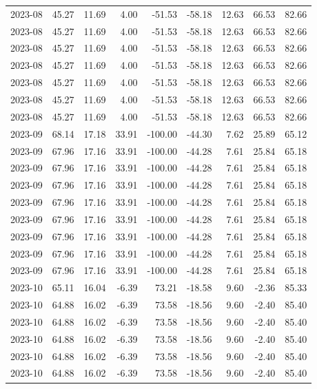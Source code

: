 \begin{table}[ht]
\begin{tabular}{lrrrrrrrr}
  2023-08 & 45.27 & 11.69 & 4.00 & -51.53 & -58.18 & 12.63 & 66.53 & 82.66 \\ 
  2023-08 & 45.27 & 11.69 & 4.00 & -51.53 & -58.18 & 12.63 & 66.53 & 82.66 \\ 
  2023-08 & 45.27 & 11.69 & 4.00 & -51.53 & -58.18 & 12.63 & 66.53 & 82.66 \\ 
  2023-08 & 45.27 & 11.69 & 4.00 & -51.53 & -58.18 & 12.63 & 66.53 & 82.66 \\ 
  2023-08 & 45.27 & 11.69 & 4.00 & -51.53 & -58.18 & 12.63 & 66.53 & 82.66 \\ 
  2023-08 & 45.27 & 11.69 & 4.00 & -51.53 & -58.18 & 12.63 & 66.53 & 82.66 \\ 
  2023-08 & 45.27 & 11.69 & 4.00 & -51.53 & -58.18 & 12.63 & 66.53 & 82.66 \\ 
  2023-09 & 68.14 & 17.18 & 33.91 & -100.00 & -44.30 & 7.62 & 25.89 & 65.12 \\ 
  2023-09 & 67.96 & 17.16 & 33.91 & -100.00 & -44.28 & 7.61 & 25.84 & 65.18 \\ 
  2023-09 & 67.96 & 17.16 & 33.91 & -100.00 & -44.28 & 7.61 & 25.84 & 65.18 \\ 
  2023-09 & 67.96 & 17.16 & 33.91 & -100.00 & -44.28 & 7.61 & 25.84 & 65.18 \\ 
  2023-09 & 67.96 & 17.16 & 33.91 & -100.00 & -44.28 & 7.61 & 25.84 & 65.18 \\ 
  2023-09 & 67.96 & 17.16 & 33.91 & -100.00 & -44.28 & 7.61 & 25.84 & 65.18 \\ 
  2023-09 & 67.96 & 17.16 & 33.91 & -100.00 & -44.28 & 7.61 & 25.84 & 65.18 \\ 
  2023-09 & 67.96 & 17.16 & 33.91 & -100.00 & -44.28 & 7.61 & 25.84 & 65.18 \\ 
  2023-09 & 67.96 & 17.16 & 33.91 & -100.00 & -44.28 & 7.61 & 25.84 & 65.18 \\ 
  2023-10 & 65.11 & 16.04 & -6.39 & 73.21 & -18.58 & 9.60 & -2.36 & 85.33 \\ 
  2023-10 & 64.88 & 16.02 & -6.39 & 73.58 & -18.56 & 9.60 & -2.40 & 85.40 \\ 
  2023-10 & 64.88 & 16.02 & -6.39 & 73.58 & -18.56 & 9.60 & -2.40 & 85.40 \\ 
  2023-10 & 64.88 & 16.02 & -6.39 & 73.58 & -18.56 & 9.60 & -2.40 & 85.40 \\ 
  2023-10 & 64.88 & 16.02 & -6.39 & 73.58 & -18.56 & 9.60 & -2.40 & 85.40 \\ 
  2023-10 & 64.88 & 16.02 & -6.39 & 73.58 & -18.56 & 9.60 & -2.40 & 85.40 \\ 

\end{tabular}
\end{table}
